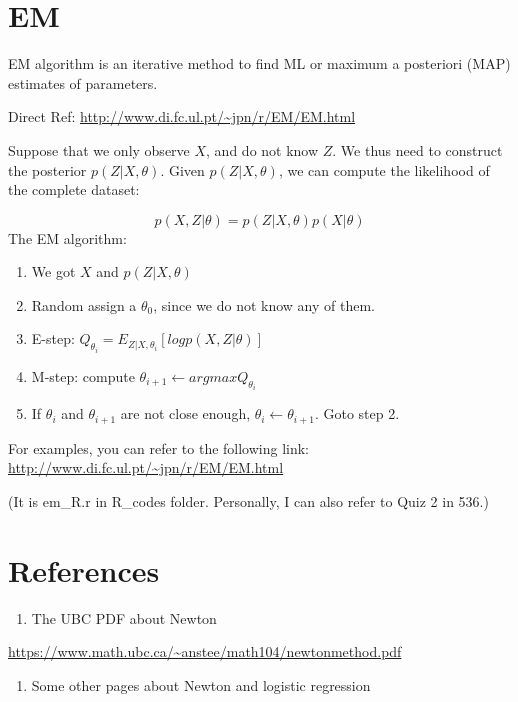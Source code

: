 \documentclass[]{book}
\providecommand{\tightlist}{%
  \setlength{\itemsep}{0pt}\setlength{\parskip}{0pt}}
\begin{document}
\hypertarget{em}{%
\section{EM}\label{em}}

EM algorithm is an iterative method to find ML or maximum a posteriori (MAP) estimates of parameters.

Direct Ref: \url{http://www.di.fc.ul.pt/~jpn/r/EM/EM.html}

Suppose that we only observe \(X\), and do not know \(Z\). We thus need to construct the posterior \(p(Z|X,\theta)\). Given \(p(Z|X,\theta)\), we can compute the likelihood of the complete dataset:

\[p(X, Z|\theta)=p(Z|X,\theta)p(X|\theta)\]
The EM algorithm:

\begin{enumerate}
\def\labelenumi{(\arabic{enumi})}
\setcounter{enumi}{-1}
\item
  We got \(X\) and \(p(Z|X,\theta)\)
\item
  Random assign a \(\theta_0\), since we do not know any of them.
\item
  E-step: \(Q_{\theta_i} = E_{Z|X,\theta_i}[log p(X,Z|\theta)]\)
\item
  M-step: compute \(\theta_{i+1} \leftarrow argmax Q_{\theta_i}\)
\item
  If \(\theta_i\) and \(\theta_{i+1}\) are not close enough, \(\theta_i \leftarrow \theta_{i+1}\). Goto step 2.
\end{enumerate}

For examples, you can refer to the following link: \url{http://www.di.fc.ul.pt/~jpn/r/EM/EM.html}

(It is em\_R.r in R\_codes folder. Personally, I can also refer to Quiz 2 in 536.)

\hypertarget{references-2}{%
\section{References}\label{references-2}}

\begin{enumerate}
\def\labelenumi{\arabic{enumi}.}
\tightlist
\item
  The UBC PDF about Newton
\end{enumerate}

\url{https://www.math.ubc.ca/~anstee/math104/newtonmethod.pdf}

\begin{enumerate}
\def\labelenumi{\arabic{enumi}.}
\setcounter{enumi}{1}
\tightlist
\item
  Some other pages about Newton and logistic regression
\end{enumerate}
\end{document}
